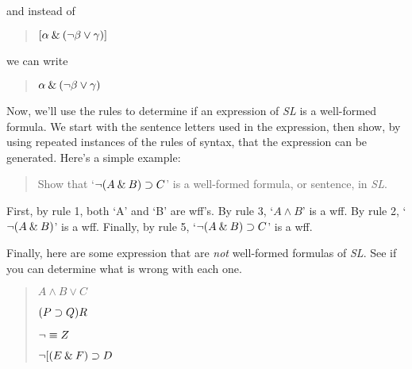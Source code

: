 \documentclass[../logic-text.tex]{subfiles}
\begin{document}
and instead of

\begin{quote}
  \([\alpha \mathbin{\&} (\neg\beta \lor \gamma)]\)
\end{quote}

we can write

\begin{quote}
  \(\alpha \mathbin{\&} (\neg\beta \lor \gamma)\)
\end{quote}

Now, we'll use the rules to determine if an expression of \emph{SL} is a well-formed formula. We start with the sentence letters used in the expression, then show, by using repeated instances of the rules of syntax, that the expression can be generated. Here's a simple example:

\begin{quote}
  Show that \enquote*{\(\neg (A \mathbin{\&} B) \supset C\)} is a well-formed formula, or sentence, in \emph{SL}.
\end{quote}


First, by rule 1, both \enquote*{A} and \enquote*{B} are wff's. By rule 3, \enquote*{\(A \land B\)} is a wff. By rule 2, \enquote*{\(\neg (A \mathbin{\&} B)\)} is a wff. Finally, by rule 5, \enquote*{\(\neg (A \mathbin{\&} B) \supset C\)} is a wff.  

Finally, here are some expression that are \emph{not} well-formed formulas of \emph{SL}. See if you can determine what is wrong with each one.

\begin{quote}
  \(A \land B \lor C\)

  \((P \supset Q)R\)

  \(\neg \equiv Z\)

  \(\neg[(E \mathbin{\&} F) \supset D\)
  
\end{quote}




\end{document}
